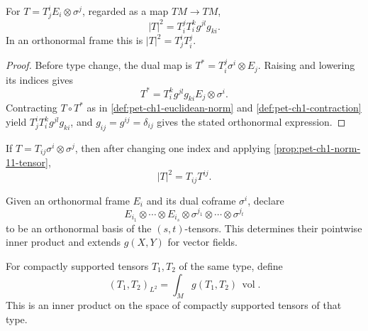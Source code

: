 \begin{proposition}
  \label{prop:pet-ch1-norm-11-tensor}


  For $T=T^i_jE_i\otimes\sigma^j$, regarded as a map $TM\to TM$,
  \[
    |T|^2=T^j_iT^k_i g^{jl}g_{ki}.
  \]
  In an orthonormal frame this is $|T|^2=T^i_jT^j_i$.
\end{proposition}
\begin{proof}

  \sketch
  Before type change, the dual map is
  $T^*=T^j_i\sigma^i\otimes E_j$. Raising and lowering its indices gives
  \[
    T^*=T^k_i g^{jl}g_{ki}E_j\otimes\sigma^i.
  \]
  Contracting $T\circ T^*$ as in
  \cref{def:pet-ch1-euclidean-norm} and
  \cref{def:pet-ch1-contraction} yield
  $T^i_jT^k_i g^{jl}g_{ki}$, and $g_{ij}=g^{ij}=\delta_{ij}$ gives the stated
  orthonormal expression.
\end{proof}

\begin{proposition}
  \label{prop:pet-ch1-norm-02-tensor}


  If $T=T_{ij}\sigma^i\otimes\sigma^j$, then after changing one index and
  applying \cref{prop:pet-ch1-norm-11-tensor},
  \[
    |T|^2=T_{ij}T^{ij}.
  \]
\end{proposition}

\begin{definition}
  \label{def:pet-ch1-pointwise-tensor-inner}


  Given an orthonormal frame $E_i$ and its dual coframe $\sigma^i$, declare
  \[
    E_{i_1}\otimes\cdots\otimes E_{i_s}\otimes
    \sigma^{j_1}\otimes\cdots\otimes\sigma^{j_t}
  \]
  to be an orthonormal basis of the $(s,t)$-tensors. This determines their
  pointwise inner product and extends $g(X,Y)$ for vector fields.
\end{definition}

\begin{definition}
  \label{def:pet-ch1-l2-tensor-inner}


  For compactly supported tensors $T_1,T_2$ of the same type, define
  \[
    (T_1,T_2)_{L^2}=\int_M g(T_1,T_2)\,\operatorname{vol}.
  \]
  This is an inner product on the space of compactly supported tensors of that
  type.
\end{definition}

